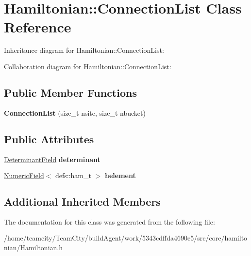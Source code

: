 \hypertarget{classHamiltonian_1_1ConnectionList}{}\section{Hamiltonian\+:\+:Connection\+List Class Reference}
\label{classHamiltonian_1_1ConnectionList}


Inheritance diagram for Hamiltonian\+:\+:Connection\+List\+:


Collaboration diagram for Hamiltonian\+:\+:Connection\+List\+:
\subsection*{Public Member Functions}
\begin{DoxyCompactItemize}
\item 
{\bfseries Connection\+List} (size\+\_\+t nsite, size\+\_\+t nbucket)\hypertarget{classHamiltonian_1_1ConnectionList_a8696d497d05710f3bfb3eff5cdaea200}{}\label{classHamiltonian_1_1ConnectionList_a8696d497d05710f3bfb3eff5cdaea200}

\end{DoxyCompactItemize}
\subsection*{Public Attributes}
\begin{DoxyCompactItemize}
\item 
\hyperlink{classDeterminantField}{Determinant\+Field} {\bfseries determinant}\hypertarget{classHamiltonian_1_1ConnectionList_a6b8f99fc32cdc563a8863dc8b81c3e87}{}\label{classHamiltonian_1_1ConnectionList_a6b8f99fc32cdc563a8863dc8b81c3e87}

\item 
\hyperlink{classNumericField}{Numeric\+Field}$<$ defs\+::ham\+\_\+t $>$ {\bfseries helement}\hypertarget{classHamiltonian_1_1ConnectionList_a2e15f602fe21f932f3c1980cb7580d0e}{}\label{classHamiltonian_1_1ConnectionList_a2e15f602fe21f932f3c1980cb7580d0e}

\end{DoxyCompactItemize}
\subsection*{Additional Inherited Members}


The documentation for this class was generated from the following file\+:\begin{DoxyCompactItemize}
\item 
/home/teamcity/\+Team\+City/build\+Agent/work/5343cdffda4690e5/src/core/hamiltonian/Hamiltonian.\+h\end{DoxyCompactItemize}
